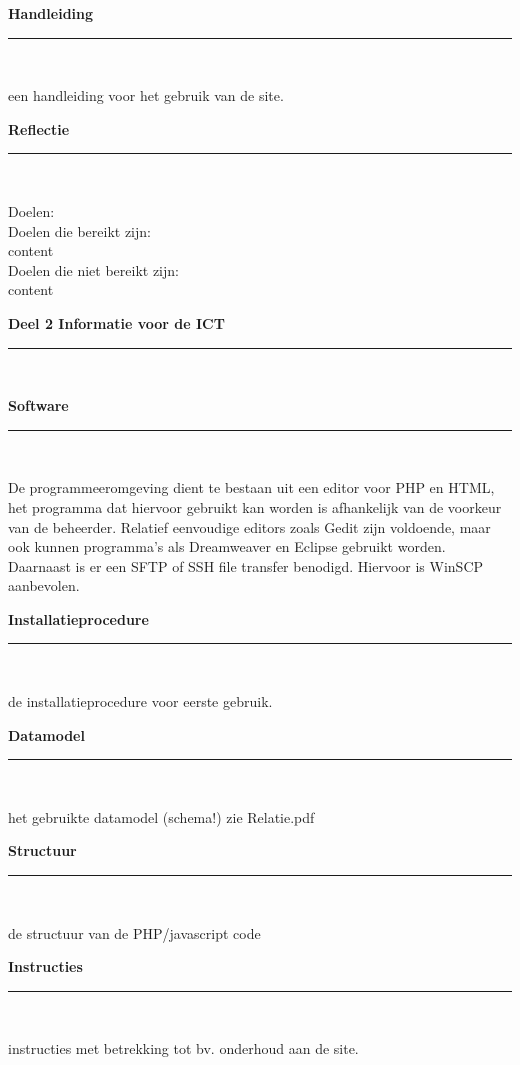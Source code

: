 \documentclass[a4paper,12pt]{article}
\newcommand{\HRule}{\rule{\linewidth}{0.5mm}}
\begin{document}
\newpage
\begin{center}
{ \LARGE \bfseries Handleiding}\\[0.1cm]
\HRule \\[0.5cm]
\end{center}
een handleiding voor het gebruik van de site.


\newpage
\begin{center}
{ \LARGE \bfseries Reflectie}\\[0.1cm]
\HRule \\[0.5cm]
\end{center}
Doelen:\\


Doelen die bereikt zijn:\\
content\\

Doelen die niet bereikt zijn:\\
content\\



\newpage
\begin{center}
{\LARGE \bfseries Deel 2 Informatie voor de ICT}\\[0.1cm]
\HRule \\[0.5cm]
\end{center}


\newpage
\begin{center}
{\LARGE \bfseries Software}\\[0.1cm]
\HRule \\[0.5cm]
\end{center}
De programmeeromgeving dient te bestaan uit een editor voor PHP en HTML, het programma dat hiervoor gebruikt kan worden is afhankelijk van de voorkeur van de beheerder. Relatief eenvoudige editors zoals Gedit zijn voldoende, maar ook kunnen programma's als Dreamweaver en Eclipse gebruikt worden. Daarnaast is er een SFTP of SSH file transfer benodigd. Hiervoor is WinSCP aanbevolen.

\newpage
\begin{center}
{\LARGE \bfseries Installatieprocedure}\\[0.1cm]
\HRule \\[0.5cm]
\end{center}
de installatieprocedure voor eerste gebruik.

\newpage
\begin{center}
{\LARGE \bfseries Datamodel}\\[0.1cm]
\HRule \\[0.5cm]
\end{center}
het gebruikte datamodel (schema!)
zie Relatie.pdf

\newpage
\begin{center}
{\LARGE \bfseries Structuur}\\[0.1cm]
\HRule \\[0.5cm]
\end{center}
de structuur van de PHP/javascript code

\newpage
\begin{center}
{\LARGE \bfseries Instructies}\\[0.1cm]
\HRule \\[0.5cm]
\end{center}
instructies met betrekking tot bv. onderhoud aan de site.
\end{document}

